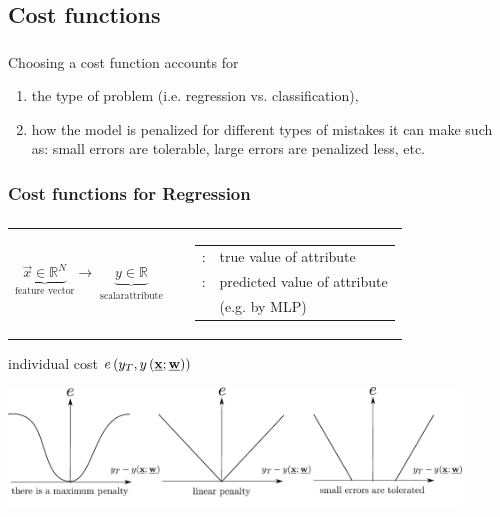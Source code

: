 \subsection{Cost functions}
\begin{frame}\frametitle{\subsecname}
Choosing a cost function accounts for 
\begin{enumerate}
\item the type of problem (i.e. regression vs. classification), 
\item how the model is penalized for different types of mistakes it can make such as:
small errors are tolerable, large errors are penalized less, etc.
\end{enumerate}
\end{frame}

\subsubsection{Cost functions for Regression}

\begin{frame}\frametitle{\subsecname}

  \begin{tabular}{c c c}
    \parbox{4cm}{
      \[ \underbrace{\vec{x}
          \in \mathbb{R}^N
      }_{\text{feature vector}}
      \longrightarrow 
      \underbrace{y
      \in \mathbb{R}
      }_{\substack{\text{scalar}\\ \text{attribute}}}
      \]}
    & & 
    \parbox{8cm}{\footnotesize
      \begin{tabular}{l l}
	$y_T(\vec x)$: & true value of attribute \\
	$y(\vec{x}; \vec w)$: & predicted value of attribute \\
					& (e.g. by MLP)
      \end{tabular}
    }
  \end{tabular}
     \pause

  \begin{block}{individual cost $e\left(y_T, y\left(\underline{\mathbf{x}}; \underline{\mathbf{w}}\right)\right)$}
    \begin{center} \includegraphics[width=12cm]{img/section1_fig17_v2.pdf} \end{center}
  \end{block}
\end{frame}

